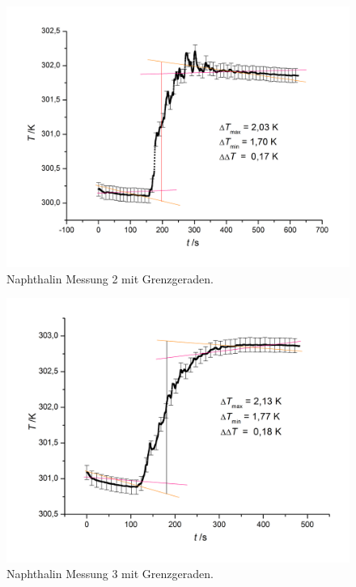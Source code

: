 \documentclass[12pt,a4paper,titlepage,headinclude,bibtotoc]{scrartcl}
\begin{document}
\begin{figure} [h!]
\begin{center}
\includegraphics[scale=0.45]{Napht2Fehler.png} \end{center}
\caption{Naphthalin Messung 2 mit Grenzgeraden.}
\end{figure}

\begin{figure} [h!]
\begin{center}
\includegraphics[scale=0.45]{Napht3Fehler.png} \end{center}
\caption{Naphthalin Messung 3 mit Grenzgeraden.}
\end{figure}
\end{document}
